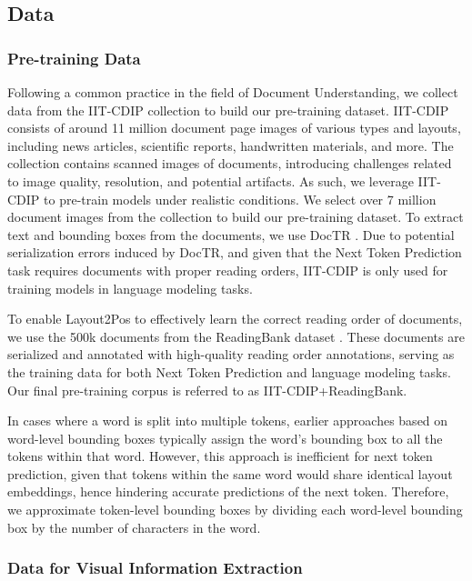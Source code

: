 \subsection{Data}

\subsubsection{Pre-training Data}

Following a common practice in the field of Document Understanding, we collect data from the IIT-CDIP collection \citep{lewis2006building} to build our pre-training dataset. IIT-CDIP consists of around 11 million document page images of various types and layouts, including news articles, scientific reports, handwritten materials, and more. The collection contains scanned images of documents, introducing challenges related to image quality, resolution, and potential artifacts. As such, we leverage IIT-CDIP to pre-train models under realistic conditions. We select over 7 million document images from the collection to build our pre-training dataset. To extract text and bounding boxes from the documents, we use DocTR \citep{doctr2021}. Due to potential serialization errors induced by DocTR, and given that the Next Token Prediction task requires documents with proper reading orders, IIT-CDIP is only used for training models in language modeling tasks. 

To enable Layout2Pos to effectively learn the correct reading order of documents, we use the 500k documents from the ReadingBank dataset \citep{wang2021layoutreader}. These documents are serialized and annotated with high-quality reading order annotations, serving as the training data for both Next Token Prediction and language modeling tasks. Our final pre-training corpus is referred to as IIT-CDIP+ReadingBank. 

In cases where a word is split into multiple tokens, earlier approaches based on word-level bounding boxes typically assign the word's bounding box to all the tokens within that word. However, this approach is inefficient for next token prediction, given that tokens within the same word would share identical layout embeddings, hence hindering accurate predictions of the next token. Therefore, we approximate token-level bounding boxes by dividing each word-level bounding box by the number of characters in the word.

\subsubsection{Data for Visual Information Extraction}


